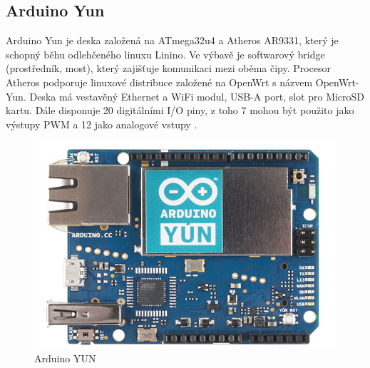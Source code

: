 	\subsection{Arduino Yun} 
	Arduino Yun je deska založená na ATmega32u4 a Atheros AR9331, který je schopný běhu odlehčeného linuxu Linino. Ve výbavě je softwarový bridge (prostředník, most), který zajišťuje komunikaci mezi oběma čipy. Procesor Atheros podporuje linuxové distribuce založené na OpenWrt s názvem OpenWrt-Yun. Deska má vestavěný Ethernet a WiFi modul, USB-A port, slot pro MicroSD kartu. Dále disponuje 20 digitálními I/O piny, z toho 7 mohou být použito jako výstupy PWM a 12 jako analogové vstupy \cite{ArduinoYun}.	
	\begin{figure}[!h]
  \begin{center}
    \includegraphics[scale=0.3]{obrazky/emded_arduino_yun}
  \end{center}
  \caption{Arduino YUN \cite{ArduinoYun}}
\end{figure}

	

